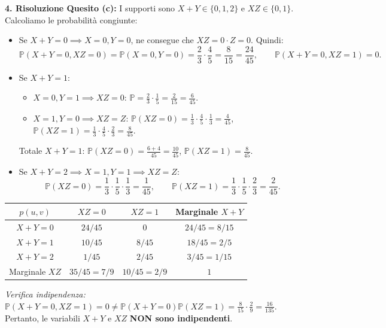 \documentclass[11pt,a4paper]{article}
\newcommand{\Prob}{\mathbb{P}}
\begin{document}
\begin{soluzionebox}
\textbf{4. Risoluzione Quesito (c):}
I supporti sono $X+Y \in \{0, 1, 2\}$ e $XZ \in \{0, 1\}$.
Calcoliamo le probabilità congiunte:
\begin{itemize}
    \item Se $X+Y=0 \implies X=0, Y=0$, ne consegue che $XZ = 0 \cdot Z = 0$. Quindi:
    \[
    \Prob(X+Y=0, XZ=0) = \Prob(X=0, Y=0) = \frac{2}{3} \cdot \frac{4}{5} = \frac{8}{15} = \frac{24}{45}, \qquad \Prob(X+Y=0, XZ=1) = 0.
    \]
    \item Se $X+Y=1$:
    \begin{itemize}
        \item $X=0, Y=1 \implies XZ=0$: $\Prob = \frac{2}{3} \cdot \frac{1}{5} = \frac{2}{15} = \frac{6}{45}$.
        \item $X=1, Y=0 \implies XZ = Z$:
        $\Prob(XZ=0) = \frac{1}{3} \cdot \frac{4}{5} \cdot \frac{1}{3} = \frac{4}{45}$, \quad $\Prob(XZ=1) = \frac{1}{3} \cdot \frac{4}{5} \cdot \frac{2}{3} = \frac{8}{45}$.
    \end{itemize}
    Totale $X+Y=1$: $\Prob(XZ=0) = \frac{6+4}{45} = \frac{10}{45}$, \quad $\Prob(XZ=1) = \frac{8}{45}$.
    \item Se $X+Y=2 \implies X=1, Y=1 \implies XZ = Z$:
    \[
    \Prob(XZ=0) = \frac{1}{3} \cdot \frac{1}{5} \cdot \frac{1}{3} = \frac{1}{45}, \qquad \Prob(XZ=1) = \frac{1}{3} \cdot \frac{1}{5} \cdot \frac{2}{3} = \frac{2}{45}.
    \]
\end{itemize}
\begin{center}
\begin{tabular}{c|cc|c}
\toprule
$p(u, v)$ & $XZ = 0$ & $XZ = 1$ & Marginale $X+Y$ \\
\midrule
$X+Y = 0$ & $24/45$ & $0$ & $24/45 = 8/15$ \\
$X+Y = 1$ & $10/45$ & $8/45$ & $18/45 = 2/5$ \\
$X+Y = 2$ & $1/45$ & $2/45$ & $3/45 = 1/15$ \\
\midrule
Marginale $XZ$ & $35/45 = 7/9$ & $10/45 = 2/9$ & $1$ \\
\bottomrule
\end{tabular}
\end{center}
\emph{Verifica indipendenza:} $\Prob(X+Y=0, XZ=1) = 0 \neq \Prob(X+Y=0)\Prob(XZ=1) = \frac{8}{15} \cdot \frac{2}{9} = \frac{16}{135}$.
Pertanto, le variabili $X+Y$ e $XZ$ \textbf{NON sono indipendenti}.
\end{soluzionebox}
\end{document}
